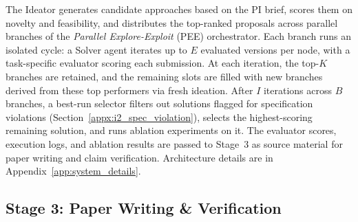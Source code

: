 The Ideator generates candidate approaches based on the PI brief, scores them on novelty and feasibility, and distributes the top-ranked proposals across parallel branches of the \emph{Parallel Explore-Exploit} (PEE) orchestrator.
Each branch runs an isolated cycle: a Solver agent iterates up to $E$ evaluated versions per node, with a task-specific evaluator scoring each submission.
At each iteration, the top-$K$ branches are retained, and the remaining slots are filled with new branches derived from these top performers via fresh ideation.
After $I$ iterations across $B$ branches, a best-run selector filters out solutions flagged for specification violations (Section~\ref{appx:i2_spec_violation}), selects the highest-scoring remaining solution, and runs ablation experiments on it.
The evaluator scores, execution logs, and ablation results are passed to Stage~3 as source material for paper writing and claim verification.
Architecture details are in Appendix~\ref{app:system_details}.


\subsection{Stage 3: Paper Writing \& Verification}
\label{sec:system:stage3}


